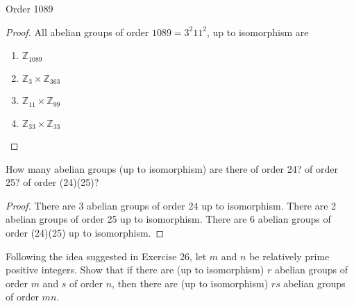 \begin{exercise}
    Order 1089
\end{exercise}

\begin{proof}
    All abelian groups of order $1089 = 3^{2}11^{2}$, up to isomorphism are
    \begin{enumerate}
        \item $\mathbb{Z}_{1089}$
        \item $\mathbb{Z}_{3} \times \mathbb{Z}_{363}$
        \item $\mathbb{Z}_{11} \times \mathbb{Z}_{99}$
        \item $\mathbb{Z}_{33} \times \mathbb{Z}_{33}$
    \end{enumerate}
\end{proof}

\begin{exercise}
    How many abelian groups (up to isomorphism) are there of order 24? of order 25? of order (24)\@(25)?
\end{exercise}

\begin{proof}
    There are 3 abelian groups of order 24 up to isomorphism. There are 2 abelian groups of order 25 up to isomorphism. There are 6 abelian groups of order (24)\@(25) up to isomorphism.
\end{proof}

\begin{exercise}
    Following the idea suggested in Exercise 26, let $m$ and $n$ be relatively prime positive integers. Show that if there are (up to isomorphism) $r$ abelian groups of order $m$ and $s$ of order $n$, then there are (up to isomorphism) $rs$ abelian groups of order $mn$.
\end{exercise}

